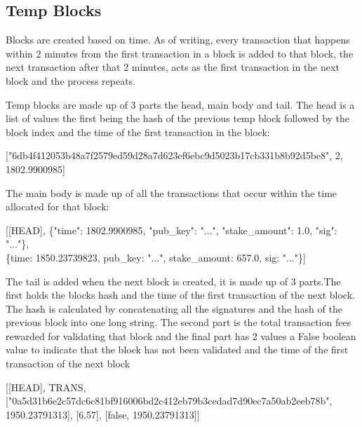 \documentclass[11pt]{article}
\begin{document}
\subsection{Temp Blocks}
Blocks are created based on time. As of writing, every transaction that happens within 2 minutes from the first transaction in a block is added to that block, the next transaction after that 2 minutes, acts as the first transaction in the next block and the process repeats. 

Temp blocks are made up of 3 parts the head, main body and tail. The head is a list of values the first being the hash of the previous temp block followed by the block index and the time of the first transaction in the block:

\begin{center}
["6db4f412053b48a7f2579ed59d28a7d623ef6ebc9d5023b17cb331b8b92d5be8", 2, 1802.9900985]
\end{center}

The main body is made up of all the transactions that occur within the time allocated for that block:

\begin{center}
[[HEAD], \{"time": 1802.9900985, "pub\_key": "...", "stake\_amount": 1.0, "sig": "..."\},\\          \hspace{0.75cm}\{time: 1850.23739823,  pub\_key: "...",  stake\_amount: 657.0,  sig: "..."\}]
\end{center}

The tail is added when the next block is created, it is made up of 3 parts.The first holds the blocks hash and the time of the first transaction of the next block. The hash is calculated by concatenating all the signatures and the hash of the previous block into one long string. The second part is the total transaction fees rewarded for validating that block and the final part has 2 values a False boolean value to indicate that the block has not been validated and the time of the first transaction of the next block
 
\begin{center}
[[HEAD], TRANS, \\\hspace{0cm}["0a5d31b6e2c57dc6c81bf916006bd2c412eb79b3cedad7d90ec7a50ab2eeb78b", 1950.23791313], [6.57], [false, 1950.23791313]]
\end{center}
\end{document}
